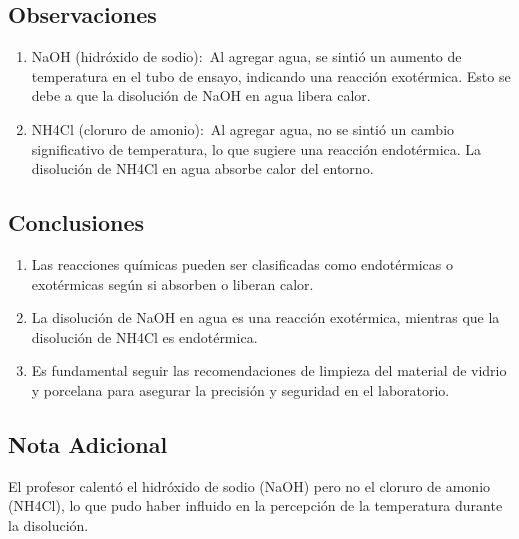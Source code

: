 \documentclass[12pt,a4paper]{report}
\begin{document}
\section*{Observaciones}
\begin{enumerate}[label=$\cdot$,left=1em]

  \item NaOH (hidróxido de sodio): Al agregar agua, se sintió un aumento de temperatura en el tubo de ensayo, indicando una reacción exotérmica. Esto se debe a que la disolución de NaOH en agua libera calor.

  \item NH4Cl (cloruro de amonio): Al agregar agua, no se sintió un cambio significativo de temperatura, lo que sugiere una reacción endotérmica. La disolución de NH4Cl en agua absorbe calor del entorno.

\end{enumerate}

\section*{Conclusiones}

\begin{enumerate}[label=$\cdot$,left=1em]

  \item Las reacciones químicas pueden ser clasificadas como endotérmicas o exotérmicas según si absorben o liberan calor.

  \item La disolución de NaOH en agua es una reacción exotérmica, mientras que la disolución de NH4Cl es endotérmica.

  \item Es fundamental seguir las recomendaciones de limpieza del material de vidrio y porcelana para asegurar la precisión y seguridad en el laboratorio.

\end{enumerate}

\section*{Nota Adicional}

El profesor calentó el hidróxido de sodio (NaOH) pero no el cloruro de amonio (NH4Cl), lo que pudo haber influido en la percepción de la temperatura durante la disolución.



\chapter{}
\end{document}
